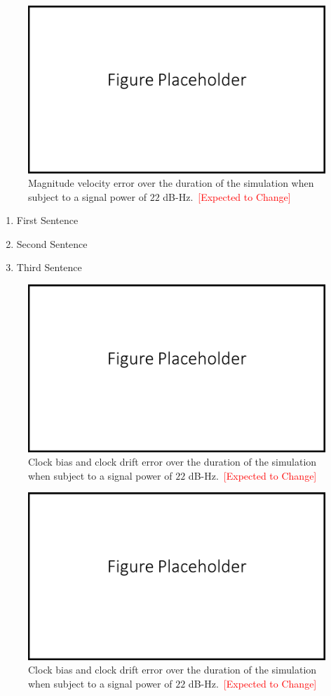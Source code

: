 \begin{figure}[!ht]
    \centering
    \includegraphics[width=0.5\linewidth]{Figures/FigurePlaceholder.png}
    \caption{Magnitude velocity error over the duration of the simulation when subject to a signal power of \(22\) dB-Hz.~\textcolor{red}{[Expected to Change]}}\label{fig:velocityerror221}
\end{figure}

\begin{enumerate}
    \item First Sentence
    \item Second Sentence
    \item Third Sentence
\end{enumerate}

\begin{figure}[!ht]
    \centering
    \includegraphics[width=0.5\linewidth]{Figures/FigurePlaceholder.png}
    \caption{Clock bias and clock drift error over the duration of the simulation when subject to a signal power of \(22\) dB-Hz.~\textcolor{red}{[Expected to Change]}}\label{fig:clockerror451}
\end{figure}

\begin{figure}[!ht]
    \centering
    \includegraphics[width=0.5\linewidth]{Figures/FigurePlaceholder.png}
    \caption{Clock bias and clock drift error over the duration of the simulation when subject to a signal power of \(22\) dB-Hz.~\textcolor{red}{[Expected to Change]}}\label{fig:clockerror221}
\end{figure}

